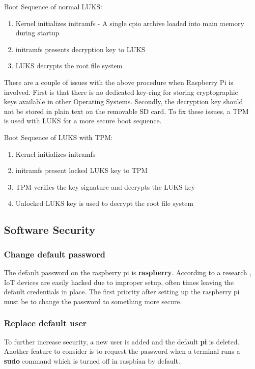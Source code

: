 \documentclass[11pt,openright]{report}
\begin{document}
Boot Sequence of normal LUKS:
\begin{enumerate}
	\item Kernel initializes initramfs - A single cpio archive loaded into main memory during startup
	\item initramfs presents decryption key to LUKS
	\item LUKS decrypts the root file system
\end{enumerate}

There are a couple of issues with the above procedure when Raspberry Pi is involved. First is that there is no dedicated key-ring for storing cryptographic keys available in other Operating Systems. Secondly, the decryption key should not be stored in plain text on the removable SD card. To fix these issues, a TPM is used with LUKS for a more secure boot sequence.

Boot Sequence of LUKS with TPM:
\begin{enumerate}
	\item Kernel initializes initramfs
	\item initramfs present locked LUKS key to TPM
	\item TPM verifies the key signature and decrypts the LUKS key
	\item Unlocked LUKS key is used to decrypt the root file system
\end{enumerate}

\subsection{Software Security}
\subsubsection{Change default password}
The default password on the raspberry pi is \textbf{raspberry}. According to a research \cite{8364059}, IoT devices are easily hacked due to improper setup, often times leaving the default credentials in place. The first priority after setting up the raspberry pi must be to change the password to something more secure.

\subsubsection{Replace default user}
To further increase security, a new user is added and the default \textbf{pi} is deleted. Another feature to consider is to request the password when a terminal runs a \textbf{sudo} command which is turned off in raspbian by default.
\end{document}
